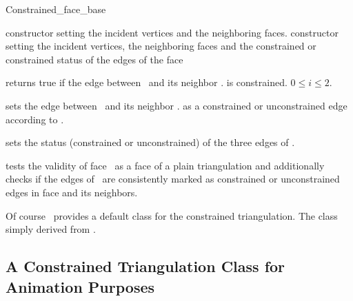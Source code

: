 \begin{ccClass}{Constrained_face_base}

\ccThreeToTwo

\ccCreation
{}
\ccGlue
{}
\ccGlue
{} 
{constructor setting the incident vertices and the neighboring faces.}
\ccGlue
{}
 {constructor setting the incident vertices, the neighboring faces and 
the constrained or constrained status of the edges of the face}
                   
{returns true if the edge between \ccVar\ and its neighbor 
\ccVar . is constrained.
\ccPrecond $0\leq i \leq 2$.}


\ccModifiers
{}
{sets the edge between \ccVar\ and its neighbor \ccVar .
 as a constrained or unconstrained edge according to .}

{sets the status (constrained or unconstrained) of the three
edges of \ccVar.}

\begin{ccAdvanced}
{tests the validity of face  \ccVar\ 
as a face of a plain triangulation
and additionally checks
if the edges of \ccVar\ are consistently marked
as constrained or unconstrained edges
in face \ccVar and its neighbors.}
\end{ccAdvanced}
\end{ccClass}


Of course  \cgal\ provides a default  class
for the constrained triangulation. The class
simply derived from 
.


\subsection{A Constrained Triangulation Class for Animation Purposes
\label{I1_Subsec_Constrained_Demo_2}}

